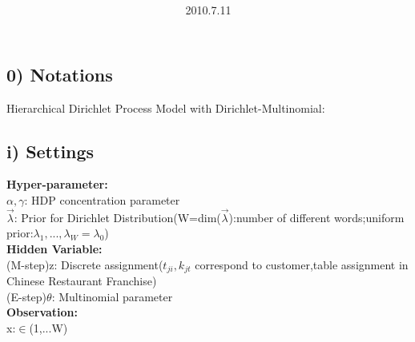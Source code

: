 \documentclass{article}
\title{\vspace{0.3in}\textmd{\textbf{\hmwkTitle}}}
\date{2010.7.11}
\author{\textbf{\hmwkAuthorName}}
\begin{document}
\begin{spacing}{1.1}
\maketitle
\section{0) Notations }
Hierarchical Dirichlet Process Model with Dirichlet-Multinomial:
\subsection{i) Settings}
{\bf Hyper-parameter:}\\
$\alpha,\gamma$: HDP concentration parameter\\
$\vec \lambda$: Prior for Dirichlet Distribution(W=dim($\vec \lambda$):number of different words;uniform prior:$\lambda_{1},...,\lambda_{W}=\lambda_{0}$)\\
{\bf Hidden Variable:}\\
(M-step)z: Discrete assignment($t_{ji},k_{jt}$ correspond to customer,table assignment in Chinese Restaurant Franchise)\\
(E-step)$\theta$: Multinomial parameter\\
{\bf Observation:}\\
x:$\in$(1,...W)\\ 

\end{spacing}
\end{document}

